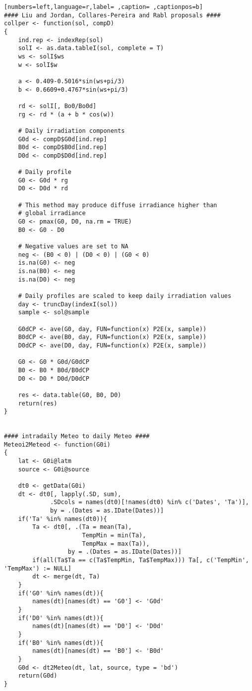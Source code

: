 \begin{lstlisting}[numbers=left,language=r,label= ,caption= ,captionpos=b]
#### Liu and Jordan, Collares-Pereira and Rabl proposals ####
collper <- function(sol, compD)
{
    ind.rep <- indexRep(sol)
    solI <- as.data.tableI(sol, complete = T)
    ws <- solI$ws
    w <- solI$w

    a <- 0.409-0.5016*sin(ws+pi/3)
    b <- 0.6609+0.4767*sin(ws+pi/3)

    rd <- solI[, Bo0/Bo0d]
    rg <- rd * (a + b * cos(w))

    # Daily irradiation components
    G0d <- compD$G0d[ind.rep]
    B0d <- compD$B0d[ind.rep]
    D0d <- compD$D0d[ind.rep]

    # Daily profile
    G0 <- G0d * rg
    D0 <- D0d * rd

    # This method may produce diffuse irradiance higher than
    # global irradiance
    G0 <- pmax(G0, D0, na.rm = TRUE)
    B0 <- G0 - D0

    # Negative values are set to NA
    neg <- (B0 < 0) | (D0 < 0) | (G0 < 0)
    is.na(G0) <- neg
    is.na(B0) <- neg
    is.na(D0) <- neg

    # Daily profiles are scaled to keep daily irradiation values
    day <- truncDay(indexI(sol))
    sample <- sol@sample

    G0dCP <- ave(G0, day, FUN=function(x) P2E(x, sample))
    B0dCP <- ave(B0, day, FUN=function(x) P2E(x, sample))
    D0dCP <- ave(D0, day, FUN=function(x) P2E(x, sample))

    G0 <- G0 * G0d/G0dCP
    B0 <- B0 * B0d/B0dCP
    D0 <- D0 * D0d/D0dCP

    res <- data.table(G0, B0, D0)
    return(res)
}


#### intradaily Meteo to daily Meteo ####
Meteoi2Meteod <- function(G0i)
{
    lat <- G0i@latm
    source <- G0i@source

    dt0 <- getData(G0i)
    dt <- dt0[, lapply(.SD, sum), 
             .SDcols = names(dt0)[!names(dt0) %in% c('Dates', 'Ta')],
             by = .(Dates = as.IDate(Dates))]
    if('Ta' %in% names(dt0)){
        Ta <- dt0[, .(Ta = mean(Ta),
                      TempMin = min(Ta),
                      TempMax = max(Ta)),
                  by = .(Dates = as.IDate(Dates))]
        if(all(Ta$Ta == c(Ta$TempMin, Ta$TempMax))) Ta[, c('TempMin', 'TempMax') := NULL]
        dt <- merge(dt, Ta)
    }
    if('G0' %in% names(dt)){
        names(dt)[names(dt) == 'G0'] <- 'G0d'
    }
    if('D0' %in% names(dt)){
        names(dt)[names(dt) == 'D0'] <- 'D0d'
    }
    if('B0' %in% names(dt)){
        names(dt)[names(dt) == 'B0'] <- 'B0d'
    }
    G0d <- dt2Meteo(dt, lat, source, type = 'bd')
    return(G0d)
}


\end{lstlisting}
